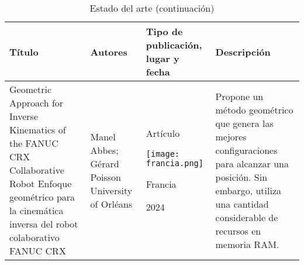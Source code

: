\newpage
\begin{table}[htb]
	\caption{Estado del arte (continuación)}
	\centering
	\begin{tabular}{p{5cm}p{4cm}p{3.6cm}p{4cm}}
		\textbf{Título} & \textbf{Autores} & \textbf{Tipo de publicación, lugar y fecha} & \textbf{Descripción} \\ 
		\midrule
		Geometric Approach for Inverse Kinematics of the FANUC CRX Collaborative Robot \cite{estado3} \newline\newline
		Enfoque geométrico para la cinemática inversa del robot colaborativo FANUC CRX &  
		Manel Abbes; Gérard Poisson \newline\newline 
		University of Orléans & 
		\begin{center}Artículo \par \texttt{[image: francia.png]} \par Francia \par 2024\end{center} & 
		Propone un método geométrico que genera las mejores configuraciones para alcanzar una posición. \newline\newline Sin embargo, utiliza una cantidad considerable de recursos en memoria RAM. \\
	\end{tabular}
\end{table}